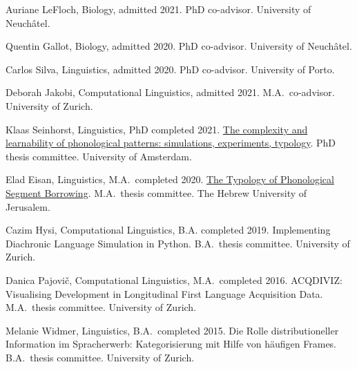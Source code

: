\documentclass[11pt]{article}
\newcommand{\hangpara}{
 \setlength{\parindent}{0in} %
 \hangindent=0.42in %
}
\begin{document}
\hangpara
\vskip 6pt
Auriane LeFloch, Biology, admitted 2021. PhD co-advisor. University of Neuchâtel.

\hangpara
\vskip 6pt
Quentin Gallot, Biology, admitted 2020. PhD co-advisor. University of Neuchâtel.

\hangpara
\vskip 6pt
Carlos Silva, Linguistics, admitted 2020. PhD co-advisor. University of Porto.

\hangpara
\vskip 6pt
Deborah Jakobi, Computational Linguistics, admitted 2021. M.A.\ co-advisor. University of Zurich.

\hangpara
\vskip 6pt
Klaas Seinhorst, Linguistics, PhD completed 2021. \href{https://www.fon.hum.uva.nl/klaas/KlaasSeinhorstDissertation.pdf}{The complexity and learnability of phonological patterns: simulations, experiments, typology}. PhD thesis committee. University of Amsterdam.

\hangpara
\vskip 6pt
Elad Eisan, Linguistics, M.A.\ completed 2020. \href{https://www.researchgate.net/publication/341734023_The_Typology_of_Phonological_Segment_Borrowing}{The Typology of Phonological Segment Borrowing}. M.A.\ thesis committee. The Hebrew University of Jerusalem.

\hangpara
\vskip 6pt
Cazim Hysi, Computational Linguistics, B.A. completed 2019. Implementing Diachronic Language Simulation in Python. B.A.\ thesis committee. University of Zurich.

\hangpara
\vskip 6pt
Danica Pajovi{\v c}, Computational Linguistics, M.A.\ completed 2016. ACQDIVIZ: Visualising Development in Longitudinal First Language Acquisition Data. M.A.\ thesis committee. University of Zurich.

\vskip 6pt
\hangpara
Melanie Widmer, Linguistics, B.A.\ completed 2015. Die Rolle distributioneller Information im Spracherwerb: Kategorisierung mit Hilfe von h{\"a}ufigen Frames. B.A.\ thesis committee. University of Zurich.
\end{document}
